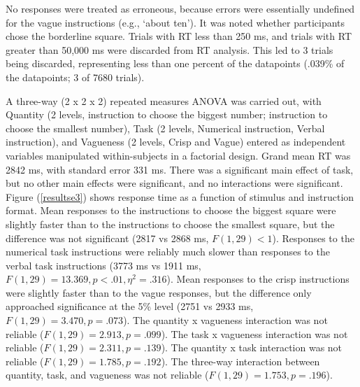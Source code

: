 \documentclass[man,floatmark]{apa}
\begin{document}
No responses were treated as erroneous, because errors were essentially undefined for the vague instructions (e.g., `about ten'). It was noted whether participants chose the borderline square. Trials with RT less than 250 ms, and trials with RT greater than 50,000 ms were discarded from RT analysis. This led to 3 trials being discarded, representing less than one percent of the datapoints (.039\% of the datapoints; 3 of 7680 trials).

A three-way (2 x 2 x 2) repeated measures ANOVA was carried out, with Quantity (2 levels, instruction to choose the biggest number; instruction to choose the smallest number), Task (2 levels, Numerical instruction, Verbal instruction), and Vagueness (2 levels, Crisp and Vague) entered as independent variables manipulated within-subjects in a factorial design. Grand mean RT was 2842 ms, with standard error 331 ms. There was a significant main effect of task, but no other main effects were significant, and no interactions were significant. Figure (\ref{resultse3}) shows response time as a function of stimulus and instruction format. Mean responses to the instructions to choose the biggest square were slightly faster than to the instructions to choose the smallest square, but the difference was not significant (2817 vs 2868 ms, $F(1,29) < 1$). Responses to the numerical  task instructions were reliably much slower than responses to the verbal  task instructions (3773 ms vs 1911 ms, $F(1,29) = 13.369, p<.01, \eta^2 = .316$). Mean responses to the crisp instructions were slightly faster than to the vague responses, but the difference only approached significance at the 5\% level (2751 vs 2933 ms, $F(1,29)=3.470, p=.073$). The quantity x vagueness interaction was not reliable ($F(1,29)=2.913,p=.099$). The task x vagueness interaction was not reliable ($F(1,29)=2.311,p=.139$). The quantity x  task interaction was not reliable ($F(1,29)=1.785,p=.192$). The three-way interaction between quantity, task, and vagueness was not reliable ($F(1,29)=1.753,p=.196$).
\end{document}
